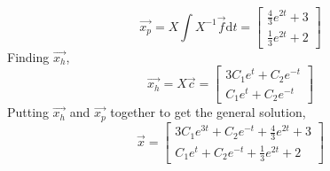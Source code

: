 \begin{equation*}
	\vec{x_p} = X\int{X^{-1}\vec{f} \mathrm{d}t} = \begin{bmatrix}
		\frac{4}{3}e^{2t} + 3 \\
		\frac{1}{3}e^{2t} + 2
	\end{bmatrix}
\end{equation*}
Finding $\vec{x_h}$,
\begin{equation*}
	\vec{x_h} = X\vec{c} = \begin{bmatrix}
			3C_1e^t + C_2e^{-t} \\
			C_1e^t + C_2e^{-t}
		\end{bmatrix}
\end{equation*}
Putting $\vec{x_h}$ and $\vec{x_p}$ together to get the general solution,
\begin{equation*}
	\vec{x} = \begin{bmatrix}
		3C_1e^{3t} + C_2e^{-t} + \frac{4}{3}e^{2t} + 3 \\
		C_1e^t + C_2e^{-t} + \frac{1}{3}e^{2t} + 2
	\end{bmatrix}
\end{equation*}